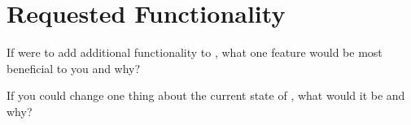 
\section{Requested Functionality}

\begin{question}
If \tc{} were to add additional functionality to \cry,
what one feature would be most beneficial to you and why?
\end{question}

\begin{question}
If you could change one thing about the current state of
\cry, what would it be and why?
\end{question}
